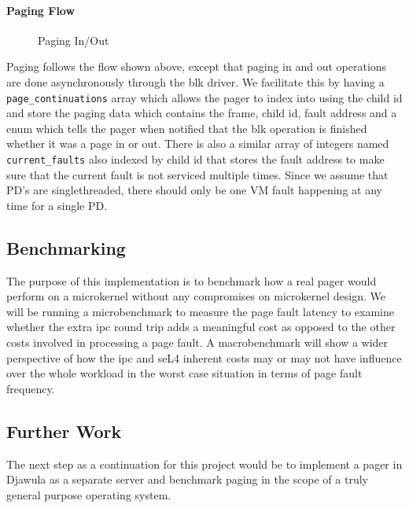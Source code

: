 \documentclass[../thesis.tex]{subfiles}
\begin{document}
\paragraph{Paging Flow}
\begin{figure}[H]
    \centering
    \resizebox{1.1\textwidth}{!}{
        
}
    \caption{Paging In/Out}
    \label{Paging In/Out}
\end{figure}
Paging follows the flow shown above, except that paging in and out operations are done asynchronously through the blk driver. We facilitate this by having a \texttt{page\_continuations} array which allows the pager to index into using the child id and store the paging data which contains the frame, child id, fault address and a enum which tells the pager when notified that the blk operation is finished whether it was a page in or out. There is also a similar array of integers named \texttt{current\_faults} also indexed by child id that stores the fault address to make sure that the current fault is not serviced multiple times. Since we assume that PD's are singlethreaded, there should only be one VM fault happening at any time for a single PD.

\subsection{Benchmarking}
The purpose of this implementation is to benchmark how a real pager would perform on a microkernel without any compromises on microkernel design. We will be running a microbenchmark to measure the page fault latency to examine whether the extra \gls{ipc} round trip adds a meaningful cost as opposed to the other costs involved in processing a page fault. A macrobenchmark will show a wider perspective of how the \gls{ipc} and seL4 inherent costs may or may not have influence over the whole workload in the worst case situation in terms of page fault frequency.

\subsection{Further Work}
The next step as a continuation for this project would be to implement a pager in Djawula as a separate server and benchmark paging in the scope of a truly general purpose operating system.

\end{document}
